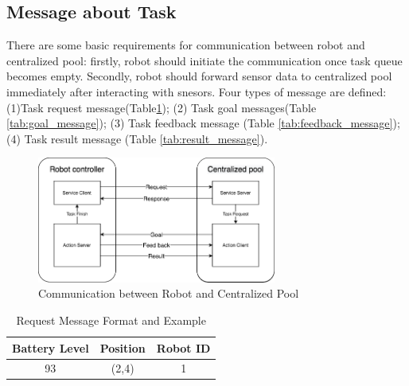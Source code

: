 \subsection{Message about Task}
\label{sec:task_message}
There are some basic requirements for communication between robot and centralized pool: firstly, robot should initiate the communication once task queue becomes empty. 
Secondly, robot should forward sensor data to centralized pool immediately after interacting with snesors. 
Four types of message are defined: 
(1)Task request message(Table\ref{tab:request_message}); (2) Task goal messages(Table \ref{tab:goal_message}); (3) Task feedback message (Table \ref{tab:feedback_message}); (4) Task result message (Table \ref{tab:result_message}). 

\begin{figure}[htbp]
    \centering
    \includegraphics[width = 0.7\textwidth]{content/images/ch4/robot_pool_comminication.drawio.png}
    \caption{Communication between Robot and Centralized Pool}
    \label{fig:communication_robot_pool}
\end{figure}

\begin{table}[htb]
\centering
\begin{tabular}{|c|c|c|} 
\hline
Battery Level & Position & Robot ID\\
\hline\hline
93	&(2,4)	&1 \\ [1ex] 
\hline
\end{tabular}
\caption{Request Message Format and Example}
\label{tab:request_message}
\end{table}

\begin{table}[htb]
\centering
{}
\caption{Action Goal Message Format and Example}
\label{tab:goal_message}
\end{table}

